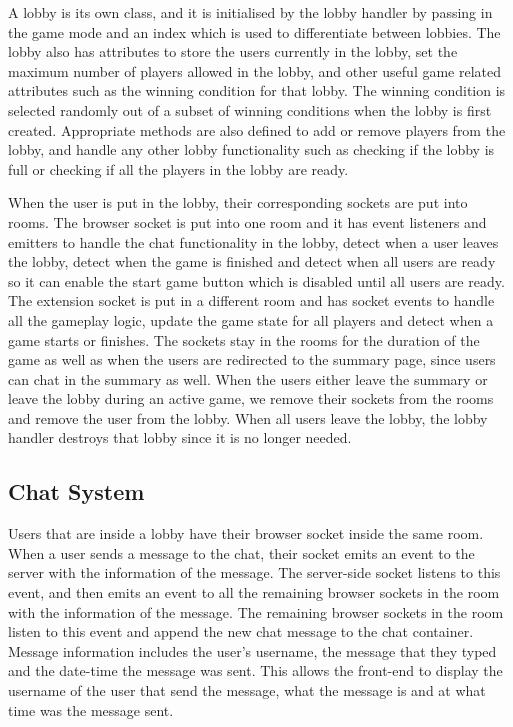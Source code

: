 \documentclass{l4proj}
\begin{document}
A lobby is its own class, and it is initialised by the lobby handler by passing in the game mode and an index which is used to differentiate between lobbies. The lobby also has attributes to store the users currently in the lobby, set the maximum number of players allowed in the lobby, and other useful game related attributes such as the winning condition for that lobby. The winning condition is selected randomly out of a subset of winning conditions when the lobby is first created. Appropriate methods are also defined to add or remove players from the lobby, and handle any other lobby functionality such as checking if the lobby is full or checking if all the players in the lobby are ready.

When the user is put in the lobby, their corresponding sockets are put into rooms. The browser socket is put into one room and it has event listeners and emitters to handle the chat functionality in the lobby, detect when a user leaves the lobby, detect when the game is finished and detect when all users are ready so it can enable the start game button which is disabled until all users are ready. The extension socket is put in a different room and has socket events to handle all the gameplay logic, update the game state for all players and detect when a game starts or finishes. The sockets stay in the rooms for the duration of the game as well as when the users are redirected to the summary page, since users can chat in the summary as well. When the users either leave the summary or leave the lobby during an active game, we remove their sockets from the rooms and remove the user from the lobby. When all users leave the lobby, the lobby handler destroys that lobby since it is no longer needed.

\subsection{Chat System}
Users that are inside a lobby have their browser socket inside the same room. When a user sends a message to the chat, their socket emits an event to the server with the information of the message. The server-side socket listens to this event, and then emits an event to all the remaining browser sockets in the room with the information of the message. The remaining browser sockets in the room listen to this event and append the new chat message to the chat container. Message information includes the user's username, the message that they typed and the date-time the message was sent. This allows the front-end to display the username of the user that send the message, what the message is and at what time was the message sent.
\end{document}
